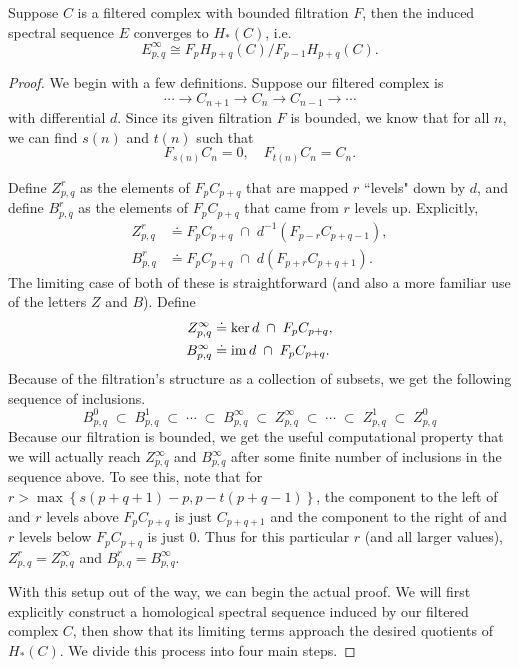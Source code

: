 \documentclass[twoside,10pt]{article}
\begin{document}
\begin{thrm}[]
	\label{thrm:filt-conv}
	Suppose $C$ is a filtered complex with bounded filtration $F$, then the induced spectral sequence $E$ converges to $H_*(C)$, i.e.
\[
	E_{p,q}^{\infty} \cong  F_{p}H_{p+q}(C)/F_{p-1}H_{p+q}(C).
\] 
\end{thrm}
\begin{proof}
	We begin with a few definitions. Suppose our filtered complex is
	\[
	\cdots \to C_{n+1}\to C_{n}\to C_{n-1}\to \cdots
\] with differential $d$. Since its given filtration $F$ is bounded, we know that for all $n$, we can find $s(n)$ and $t(n)$ such that
\[
	F_{s(n)}C_{n}=0, \quad F_{t(n)}C_{n}=C_{n}.
\]

Define $Z_{p,q}^{r}$ as the elements of $F_{p}C_{p+q}$ that are mapped $r$ ``levels" down by $d$, and define $B_{p,q}^{r}$ as the elements of $F_{p}C_{p+q}$ that came from $r$ levels up. Explicitly,
\begin{align*}
	Z_{p,q}^{r} &\doteq F_{p}C_{p+q} \;\cap\; d^{-1}(F_{p-r}C_{p+q-1}),\\
	B_{p,q}^{r} &\doteq F_{p}C_{p+q} \;\cap\; d(F_{p+r}C_{p+q+1}).
\end{align*}
The limiting case of both of these is straightforward (and also a more familiar use of the letters $Z$ and $B$). Define
\begin{align*}
	Z_{p,q}^{\infty} &\doteq \ker d \;\cap\; F_{p}C_{p+q},\\
	B_{p,q}^{\infty} &\doteq \operatorname{im} d \;\cap\; F_{p}C_{p+q}.
\end{align*}
Because of the filtration's structure as a collection of subsets, we get the following sequence of inclusions.
\[
B_{p,q}^{0}\;\subset \;B_{p,q}^{1}\;\subset \;\cdots\;\subset \;B_{p,q}^{\infty}\;\subset \;Z_{p,q}^{\infty}\;\subset \;\cdots\;\subset \;Z_{p,q}^{1}\;\subset \;Z_{p,q}^{0}
\] 
Because our filtration is bounded, we get the useful computational property that we will actually reach $Z_{p,q}^{\infty}$ and $B_{p,q}^{\infty}$ after some finite number of inclusions in the sequence above. To see this, note that for $r > \max\left\{ s(p+q+1)-p, p-t(p+q-1) \right\}$, the component to the left of and $r$ levels above $F_{p}C_{p+q}$ is just $C_{p+q+1}$ and the component to the right of and $r$ levels below $F_{p}C_{p+q}$ is just 0. Thus for this particular $r$ (and all larger values), $Z_{p,q}^{r}=Z_{p,q}^{\infty}$ and $B_{p,q}^{r}=B_{p,q}^{\infty}$.

With this setup out of the way, we can begin the actual proof. We will first explicitly construct a homological spectral sequence induced by our filtered complex $C$, then show that its limiting terms approach the desired quotients of $H_{*}(C)$. We divide this process into four main steps.


\end{proof}
\end{document}

